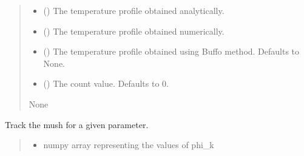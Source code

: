\documentclass[a4paper,11pt,english,openany]{sphinxmanual}
\begin{document}
\begin{fulllineitems}
\begin{fulllineitems}
\begin{quote}
\begin{description}
\begin{itemize}
\item {} 
\sphinxAtStartPar
{} () \textendash{} The temperature profile obtained analytically.

\item {} 
\sphinxAtStartPar
{} () \textendash{} The temperature profile obtained numerically.

\item {} 
\sphinxAtStartPar
{} (\sphinxstyleliteralemphasis{\sphinxupquote{, }}) \textendash{} The temperature profile obtained using Buffo method. Defaults to None.

\item {} 
\sphinxAtStartPar
{} (\sphinxstyleliteralemphasis{\sphinxupquote{, }}) \textendash{} The count value. Defaults to 0.

\end{itemize}

\sphinxAtStartPar
None

\end{description}\end{quote}

\end{fulllineitems}


\begin{fulllineitems}
\label{\detokenize{api/spyice.models.sea_ice_model:spyice.models.sea_ice_model.SeaIceModel.track_mush_for_parameter}}
\pysigstartsignatures
{}
\pysigstopsignatures
\sphinxAtStartPar
Track the mush for a given parameter.
\begin{quote}\begin{description}
\begin{itemize}
\item {} 
\sphinxAtStartPar
{} \textendash{} numpy array representing the values of phi\_k


\end{itemize}
\end{description}
\end{quote}
\end{fulllineitems}
\end{fulllineitems}
\end{document}
